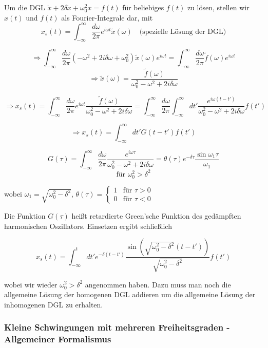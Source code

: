\documentclass[10pt, letterpaper]{article}
\begin{document}
Um die DGL $\ddot{x}+2\delta\dot{x}+\omega_0^2x=f(t)$ für beliebiges $f(t)$ zu lösen, stellen wir $x(t)$ und $f(t)$ als Fourier-Integrale dar, mit
\[x_s(t)=\int_{-\infty}^{\infty}\frac{d\omega}{2\pi}e^{i\omega t}\tilde{x}(\omega)\quad\text{(spezielle Lösung der DGL)}\]

\[\Rightarrow \int_{-\infty}^{\infty}\frac{d\omega}{2\pi}(-\omega^2+2i\delta\omega+\omega_0^2)\tilde{x}(\omega)e^{i\omega t}=\int_{-\infty}^{\infty}\frac{d\omega}{2\pi}\tilde{f}(\omega)e^{i\omega t}\]
\[\Rightarrow \tilde{x}(\omega)=\frac{\tilde{f}(\omega)}{\omega_0^2-\omega^2+2i\delta\omega}\]

\[\Rightarrow x_s(t)=\int_{-\infty}^{\infty}\frac{d\omega}{2\pi}e^{i\omega t}\frac{\tilde{f}(\omega)}{\omega_0^2-\omega^2+2i\delta\omega}=\int_{-\infty}^{\infty}\frac{d\omega}{2\pi}\int_{-\infty}^{\infty}dt'\frac{e^{i\omega(t-t')}}{\omega_0^2-\omega^2+2i\delta\omega}f(t')\]

\[\Rightarrow x_s(t)=\int_{-\infty}^{\infty}dt'G(t-t')f(t')\]

\[G(\tau)=\int_{-\infty}^{\infty}\frac{d\omega}{2\pi}\frac{e^{i\omega\tau}}{\omega_0^2-\omega^2+2i\delta\omega}=\theta(\tau)e^{-\delta\tau}\frac{\sin\omega_1\tau}{\omega_1}\]
\[\text{für }\omega_0^2>\delta^2\]

wobei $\omega_1=\sqrt{\omega_0^2-\delta^2}$, $\theta(\tau)=\begin{cases}1 & \text{für }\tau>0\\ 0 & \text{für }\tau<0\end{cases}$

Die Funktion $G(\tau)$ heißt retardierte Green'sche Funktion des gedämpften harmonischen Oszillators. Einsetzen ergibt schließlich

\[x_s(t)=\int_{-\infty}^t dt'e^{-\delta(t-t')}\frac{\sin(\sqrt{\omega_0^2-\delta^2}(t-t'))}{\sqrt{\omega_0^2-\delta^2}}f(t')\]

wobei wir wieder $\omega_0^2>\delta^2$ angenommen haben. Dazu muss man noch die allgemeine Lösung der homogenen DGL addieren um die allgemeine Lösung der inhomogenen DGL zu erhalten.








\pagebreak



\subsubsection{Kleine Schwingungen mit mehreren Freiheitsgraden - Allgemeiner Formalismus}
\end{document}
